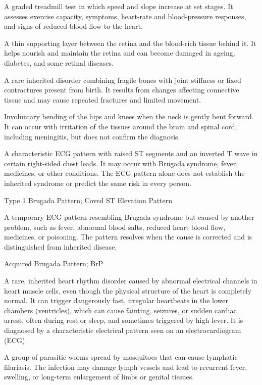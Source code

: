  A graded treadmill test in which speed and slope increase at set stages. It assesses exercise capacity, symptoms, heart-rate and blood-pressure responses, and signs of reduced blood flow to the heart.

 A thin supporting layer between the retina and the blood-rich tissue behind it. It helps nourish and maintain the retina and can become damaged in ageing, diabetes, and some retinal diseases.

 A rare inherited disorder combining fragile bones with joint stiffness or fixed contractures present from birth. It results from changes affecting connective tissue and may cause repeated fractures and limited movement.

 Involuntary bending of the hips and knees when the neck is gently bent forward. It can occur with irritation of the tissues around the brain and spinal cord, including meningitis, but does not confirm the diagnosis.

 A characteristic ECG pattern with raised ST segments and an inverted T wave in certain right-sided chest leads. It may occur with Brugada syndrome, fever, medicines, or other conditions. The ECG pattern alone does not establish the inherited syndrome or predict the same risk in every person.

\synonyms
Type 1 Brugada Pattern; Coved ST Elevation Pattern

 A temporary ECG pattern resembling Brugada syndrome but caused by another problem, such as fever, abnormal blood salts, reduced heart blood flow, medicines, or poisoning. The pattern resolves when the cause is corrected and is distinguished from inherited disease.

\synonyms
Acquired Brugada Pattern; BrP

 A rare, inherited heart rhythm disorder caused by abnormal electrical channels in heart muscle cells, even though the physical structure of the heart is completely normal. It can trigger dangerously fast, irregular heartbeats in the lower chambers (ventricles), which can cause fainting, seizures, or sudden cardiac arrest, often during rest or sleep, and sometimes triggered by high fever. It is diagnosed by a characteristic electrical pattern seen on an electrocardiogram (ECG).

 A group of parasitic worms spread by mosquitoes that can cause lymphatic filariasis. The infection may damage lymph vessels and lead to recurrent fever, swelling, or long-term enlargement of limbs or genital tissues.

